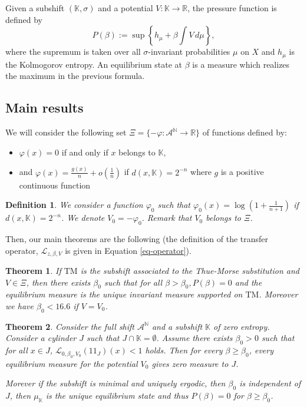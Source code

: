 \documentclass[11 pt]{article}
\newtheorem{mainth}{Theorem}
\newtheorem{definition}[proposition]{Definition}
\def\R{{\mathbb R}}
\def\K{{\mathbb K}}
\def\s{\sigma}
\def\be{\beta}
\def\disp{}%
\newcommand{\BBone}{{1\!\!1}}
\theoremstyle{definition}
\begin{document}
Given a subshift $(\K,\s)$ and a potential  $V:\K\to\R$, the pressure function is defined by 
$$P(\be):=\sup\left\{h_{\mu}+\be\int V\,d\mu\right\},$$
where the supremum is taken over all $\s$-invariant probabilities $\mu$ on $X$ and $h_{\mu}$ is the Kolmogorov entropy. An equilibrium state at $\be$ is a measure which realizes the maximum in the previous formula.


\subsection{Main results}


We will consider the following set $\Xi=\{-\varphi: \mathcal A^{\mathbb N}\rightarrow \mathbb R\}$ of functions defined by:
\begin{itemize}
\item $\varphi(x)=0$ if and only if $x$ belongs to $\K,$ 
\item and $\varphi(x)=\frac{\disp g(x)}{n}+o(\frac1n)$ if $d(x,\K)=2^{-n}$ where $g$ is a positive continuous function 
\end{itemize}

\begin{definition}\label{def-potentiel0}
We consider a function $\varphi_0$ such that $\varphi_0(x)=\log{(1+\frac{1}{n+1})}$ if $d(x,\mathbb K)=2^{-n}$. We denote $V_0=-\varphi_0$. Remark that $V_0$ belongs to $\Xi$.
\end{definition}

Then, our main theorems are the following (the definition of the transfer operator, $\mathcal L_{z,\beta,V}$ is given in Equation \eqref{eq-operator}).


\begin{mainth}\label{thm-tm}
If $\mathrm{TM}$ is the subshift associated to the Thue-Morse substitution and $V\in \Xi$, then there exists $\beta_0$ such that for all $\beta>\beta_0, P(\beta)=0$ and the equilibrium measure is the unique invariant measure supported on $\mathrm{TM}$. Moreover we have $\beta_0<16.6$ if $V=V_0$.
\end{mainth}





\begin{mainth}
\label{thm:meta-phase}
Consider the full shift $\mathcal{A}^\mathbb{N}$ and a subshift $\mathbb{K}$ of zero entropy.%
 Consider a cylinder $J$ such that $J\cap \mathbb{K}=\emptyset$. Assume there exists $\beta_0>0$ such that for all  $x\in J$,  
$\disp \mathcal{L}_{0,\beta_{0},V_0}(\BBone_J)(x)<1$ holds. 
Then for every $\be\ge\be_{0}$, every equilibrium measure for the potential $V_0$ gives zero measure to $J$. 

Morever if the subshift is minimal and uniquely ergodic, then $\beta_0$ is independent of $J$, then $\mu_{\mathbb{K}}$ is the unique equilibrium state and thus $P(\beta)=0$ for $\beta\geq \beta_0$.

\end{mainth}
\end{document}
